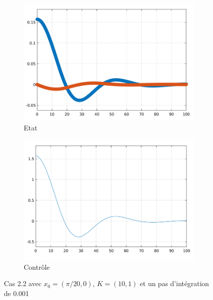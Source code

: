 \documentclass[a4paper]{article}
\begin{document}
                        \begin{figure}[h!]
                                \centering
                                \begin{subfigure}[b]{0.45\textwidth}
                                        \includegraphics[width=\textwidth]{images/courbe_cas_2_2_TP02.png}
                                        \caption{Etat}
                                        \label{fig3.3.1}
                                \end{subfigure}
                                \hspace{30pt}
                                \begin{subfigure}[b]{0.45\textwidth}
                                        \includegraphics[width=\textwidth]{images/controle_cas_2_2_TP02.png}
                                        \caption{Contrôle}
                                        \label{fig3.3.2}
                                \end{subfigure}
                                \caption{Cas 2.2 avec $x_0=(\pi/20, 0)$, $K=(10,1)$ et un pas d'intégration de 0.001}
                                \label{fig3.3}
                        \end{figure}
\end{document}
